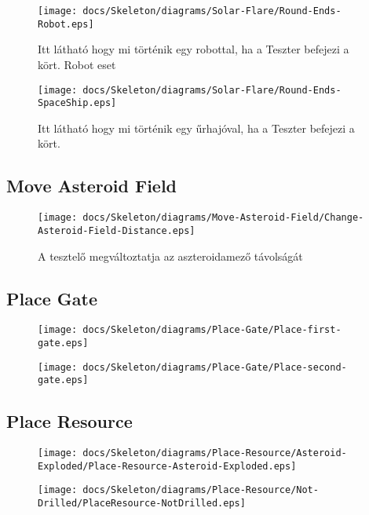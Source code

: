 \begin{figure}[H] 
    \centering 
    \texttt{[image: docs/Skeleton/diagrams/Solar-Flare/Round-Ends-Robot.eps]} 
    \caption{Itt látható hogy mi történik egy robottal, ha a Teszter befejezi a kört. Robot eset} 
\end{figure}

\begin{figure}[H] 
    \centering 
    \texttt{[image: docs/Skeleton/diagrams/Solar-Flare/Round-Ends-SpaceShip.eps]} 
    \caption{Itt látható hogy mi történik egy űrhajóval, ha a Teszter befejezi a kört.} 
\end{figure}


\subsection{Move Asteroid Field}

\begin{figure}[H] 
    \centering 
    \texttt{[image: docs/Skeleton/diagrams/Move-Asteroid-Field/Change-Asteroid-Field-Distance.eps]} 
    \caption{A tesztelő megváltoztatja az aszteroidamező távolságát} 
\end{figure}



\subsection{Place Gate}

\begin{figure}[H] 
    \centering 
    \texttt{[image: docs/Skeleton/diagrams/Place-Gate/Place-first-gate.eps]} 
    \caption{} 
\end{figure} 

\begin{figure}[H] 
    \centering 
    \texttt{[image: docs/Skeleton/diagrams/Place-Gate/Place-second-gate.eps]} 
    \caption{} 
\end{figure} 



\subsection{Place Resource}

\begin{figure}[H] 
    \centering 
    \texttt{[image: docs/Skeleton/diagrams/Place-Resource/Asteroid-Exploded/Place-Resource-Asteroid-Exploded.eps]} 
    \caption{} 
\end{figure} 

\begin{figure}[H] 
    \centering 
    \texttt{[image: docs/Skeleton/diagrams/Place-Resource/Not-Drilled/PlaceResource-NotDrilled.eps]} 
    \caption{} 
\end{figure} 